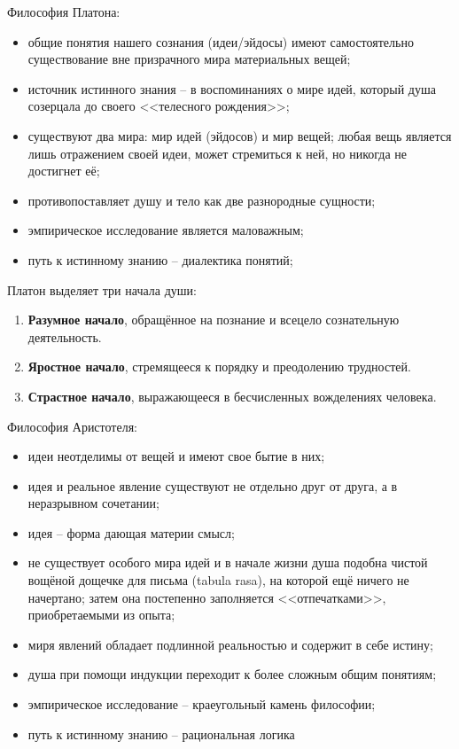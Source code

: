 
Философия Платона:
\begin{itemize}
    \item общие понятия нашего сознания (идеи/эйдосы) имеют самостоятельно существование вне призрачного мира 
        материальных вещей;
    \item источник истинного знания -- в воспоминаниях о мире идей, который душа созерцала до своего 
        <<телесного рождения>>;
    \item существуют два мира: мир идей (эйдосов) и мир вещей; любая вещь является лишь отражением своей 
        идеи, может стремиться к ней, но никогда не достигнет её;
    \item противопоставляет душу и тело как две разнородные сущности;
    \item эмпирическое исследование является маловажным;
    \item путь к истинному знанию -- диалектика понятий;
\end{itemize}

Платон выделяет три начала души:
\begin{enumerate}
    \item \textbf{Разумное начало}, обращённое на познание и всецело сознательную деятельность.
    \item \textbf{Яростное начало}, стремящееся к порядку и преодолению трудностей.
    \item \textbf{Страстное начало}, выражающееся в бесчисленных вожделениях человека.
\end{enumerate}

Философия Аристотеля:
\begin{itemize}
    \item идеи неотделимы от вещей и имеют свое бытие в них;
    \item идея и реальное явление существуют не отдельно друг от друга, а в неразрывном сочетании;
    \item идея -- форма дающая материи смысл;
    \item не существует особого мира идей и в начале жизни душа подобна чистой вощёной дощечке для письма 
        (tabula rasa), на которой ещё ничего не начертано; затем она постепенно заполняется <<отпечатками>>, 
        приобретаемыми из опыта;
    \item миря явлений обладает подлинной реальностью и содержит в себе истину;
    \item душа при помощи индукции переходит к более сложным общим понятиям;
    \item эмпирическое исследование -- краеугольный камень философии;
    \item путь к истинному знанию -- рациональная логика
\end{itemize}

